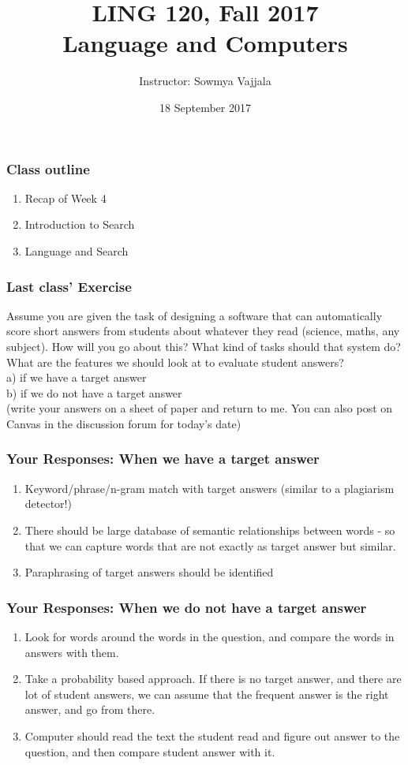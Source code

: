 \documentclass{beamer}
\author[Sowmya Vajjala]{Instructor: Sowmya Vajjala}
\title[LING 120]{LING 120, Fall 2017 \\ Language and Computers}
\date{18 September 2017}
\institute{Iowa State University, USA}
\begin{document}
\begin{frame}\titlepage
\end{frame}

\begin{frame}
\frametitle{Class outline}%
\begin{enumerate}
\item Recap of Week 4
\item Introduction to Search
\item Language and Search
\end{enumerate}
\end{frame}

\begin{frame}
\frametitle{Last class' Exercise}
Assume you are given the task of designing a software that can automatically score short answers from students about whatever they read (science, maths, any subject). 
How will you go about this? What kind of tasks should that system do? What are the features we should look at to evaluate student answers? \\
a) if we have a target answer \\
b) if we do not have a target answer
\\ \medskip (write your answers on a sheet of paper and return to me. You can also post on Canvas in the discussion forum for today's date)
\end{frame}

\begin{frame}
\frametitle{Your Responses: When we have a target answer}%
\begin{enumerate}
\item Keyword/phrase/n-gram match with target answers (similar to a plagiarism detector!) \pause
\item There should be large database of semantic relationships between words - so that we can capture words that are not exactly as target answer but similar.  \pause
\item Paraphrasing of target answers should be identified \pause 
\end{enumerate}
\end{frame}

\begin{frame}
\frametitle{Your Responses: When we do not have a target answer}%
\begin{enumerate}
\item Look for words around the words in the question, and compare the words in answers with them. \pause
\item Take a probability based approach. If there is no target answer, and there are lot of student answers, we can assume that the frequent answer is the right answer, and go from there. \pause
\item Computer should read the text the student read and figure out answer to the question, and then compare student answer with it. 
\end{enumerate}
\end{frame}
\end{document}
